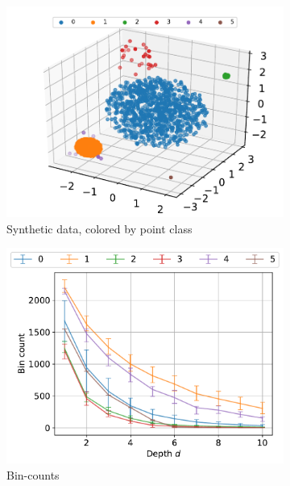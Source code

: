 \documentclass[11pt,onecolumn]{article}
\begin{document}
\begin{figure}[ht!]
    \centering
    \begin{subfigure}[t]{0.48\textwidth}
        \centering
        \includegraphics[width=\linewidth]{fig/syndata.pdf}
        \caption{Synthetic data, colored by point class}
    \end{subfigure}
    \hfill
    \begin{subfigure}[t]{0.48\textwidth}
        \centering
        \includegraphics[width=\linewidth]{fig/chains_type_bincounts_k50c50d10.pdf}
        \caption{Bin-counts}
    \end{subfigure}
		\\
    \begin{subfigure}[t]{0.48\textwidth}

\end{subfigure}
\end{figure}
\end{document}
